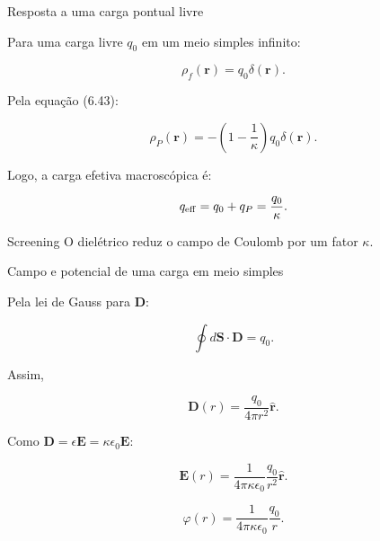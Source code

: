 \documentclass[aspectratio=169]{beamer}
\begin{document}
\begin{frame}{Resposta a uma carga pontual livre}

\small

Para uma carga livre \(q_0\) em um meio simples infinito:

\[
\rho_f(\mathbf r)=q_0\delta(\mathbf r).
\]

Pela equação (6.43):

\begin{eqbox}
\begin{equation}
\rho_P(\mathbf r)
=
-\left(1-\frac{1}{\kappa}\right)
q_0\delta(\mathbf r).
\tag{6.45}
\label{eq:screening-carga-ponto}
\end{equation}
\end{eqbox}

Logo, a carga efetiva macroscópica é:

\[
q_{\rm eff}
=
q_0+q_P
=
\frac{q_0}{\kappa}.
\]

\begin{alertblock}{Screening}
O dielétrico reduz o campo de Coulomb por um fator \(\kappa\).
\end{alertblock}

\end{frame}

\begin{frame}{Campo e potencial de uma carga em meio simples}

\small

Pela lei de Gauss para \(\mathbf D\):

\[
\oint d\mathbf S\cdot\mathbf D=q_0.
\]

Assim,

\[
\mathbf D(r)=\frac{q_0}{4\pi r^2}\hat{\mathbf r}.
\]

Como \(\mathbf D=\epsilon\mathbf E=\kappa\epsilon_0\mathbf E\):

\begin{eqbox}
\begin{equation}
\mathbf E(r)
=
\frac{1}{4\pi\kappa\epsilon_0}
\frac{q_0}{r^2}\hat{\mathbf r}.
\tag{6.46}
\end{equation}
\end{eqbox}

\begin{eqbox}
\begin{equation}
\varphi(r)
=
\frac{1}{4\pi\kappa\epsilon_0}
\frac{q_0}{r}.
\tag{6.47}
\end{equation}
\end{eqbox}

\end{frame}
\end{document}
